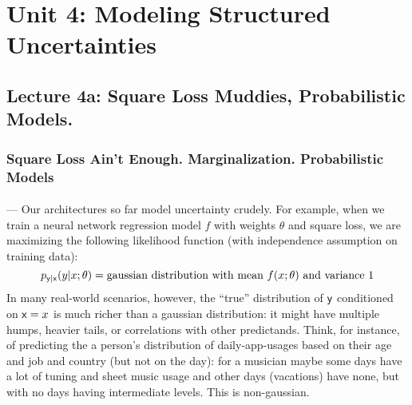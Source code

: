 \documentclass[12pt]{article}
\begin{document}

\newcommand{\defined}[1]{\textbf{#1}}

  \section*{\sc Unit 4: Modeling Structured Uncertainties}
    \subsection*{Lecture 4a: Square Loss Muddies, Probabilistic Models.}
      \subsubsection*{Square Loss Ain't Enough.  Marginalization.  Probabilistic Models}



        \paragraph{\sf} --- Our architectures so far model uncertainty crudely.
        For example, when we train a neural network regression model $f$ with
        weights $\theta$ and square loss, we are maximizing the following
        likelihood function (with independence assumption on training data):
        $$
          p_{\mathsf{y}|\mathsf{x}}(y|x;\theta) = \text{gaussian distribution with mean $f(x;\theta)$ and variance $1$}
        $$
        In many real-world scenarios, however, the ``true'' distribution of
        $\mathsf{y}$ conditioned on $\mathsf{x}=x$ is much richer than a gaussian
        distribution: it might have multiple humps, heavier tails, or
        correlations with other predictands.  Think, for instance, of
        predicting the a person's distribution of daily-app-usages based on
        their age and job and country (but not on the day): for a musician
        maybe some days have a lot of tuning and sheet music usage and other
        days (vacations) have none, but with no days having intermediate
        levels.  This is non-gaussian.
\end{document}

